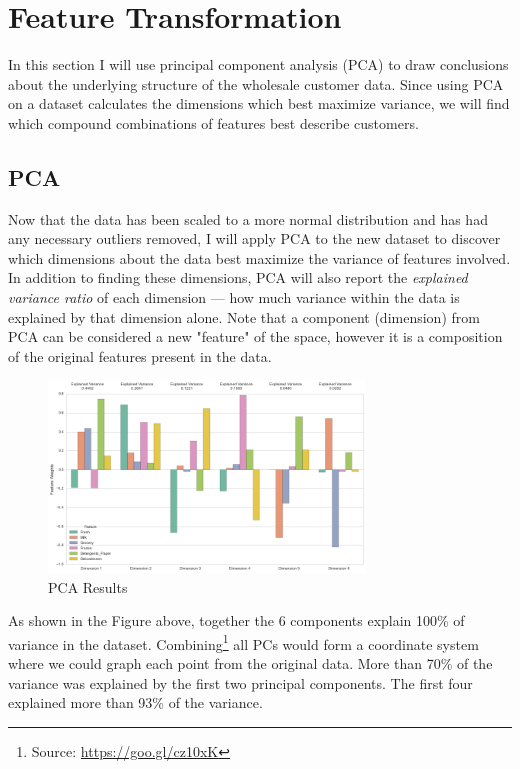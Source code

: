 \documentclass[a4paper]{article}
\begin{document}

\section{Feature Transformation}
\label{sec:feature_transformation}
In this section I will use principal component analysis (PCA) to draw conclusions about the underlying structure of the wholesale customer data. Since using PCA on a dataset calculates the dimensions which best maximize variance, we will find which compound combinations of features best describe customers.

\subsection{PCA}

Now that the data has been scaled to a more normal distribution and has had any necessary outliers removed, I will apply PCA to the new dataset to discover which dimensions about the data best maximize the variance of features involved. In addition to finding these dimensions, PCA will also report the \textit{explained variance ratio} of each dimension — how much variance within the data is explained by that dimension alone. Note that a component (dimension) from PCA can be considered a new "feature" of the space, however it is a composition of the original features present in the data.

\begin{figure}[ht!]
\centering
\includegraphics[width=0.75\textwidth]{figures/pca_results.png}
\caption{\label{fig:pca_results}PCA Results}
\end{figure}

As shown in the Figure above, together the 6 components explain 100\% of variance in the dataset. Combining\footnote{Source: \url{https://goo.gl/cz10xK}} all PCs would form a coordinate system where we could graph each point from the original data. More than 70\% of the variance was explained by the first two principal components. The first four explained more than 93\% of the variance.
\end{document}
